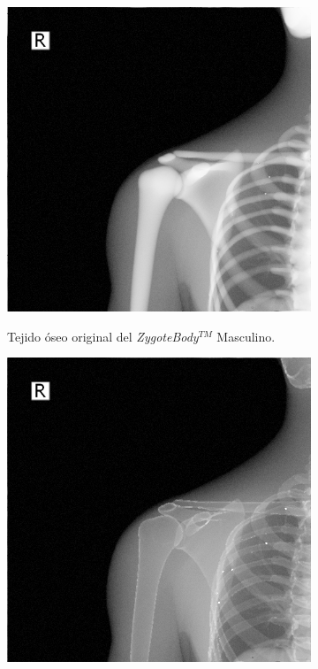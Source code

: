 \begin{figure}[ht]
    \begin{subfigure}[b]{0.45\linewidth}
        \centering
        {\includegraphics[width=\linewidth]{IMG/xraynointernal.png}}
        \caption{Tejido óseo original del \emph{ZygoteBody}$^{TM}$ Masculino\label{subfig:nointernal}.}
    \end{subfigure}
    \null\hfill
     \begin{subfigure}[b]{0.45\linewidth}
        \centering
        {\includegraphics[width=\linewidth]{IMG/xrayinternal.png}}

\end{subfigure}
\end{figure}
